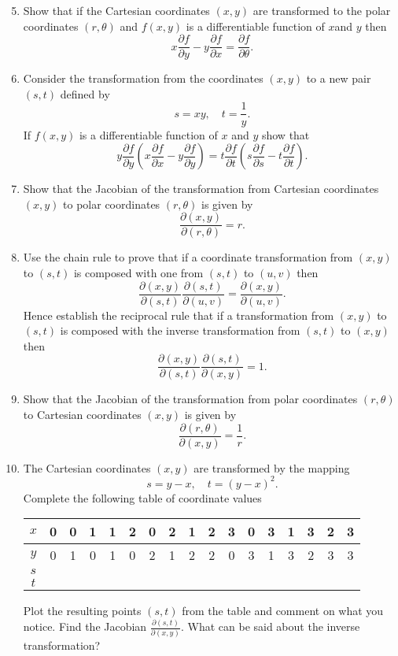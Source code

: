 \documentclass[20pt, a4paper]{extarticle}
\begin{document}
\begin{enumerate}
    \setcounter{enumi}{4}
\item




Show that if the Cartesian  coordinates $(x,y)$ are transformed to the polar coordinates $(r,\theta)$ and $f(x,y)$ is a differentiable function of $x$and $y$ then 
$$x \frac{\partial f}{\partial y} - y \frac{\partial f}{\partial x} = \frac{\partial f}{\partial \theta}.$$
\item
Consider the transformation from the coordinates $(x,y)$ to a new pair $(s,t)$ defined by 
$$s=xy, \quad t=\frac{1}{y} .$$
If $f(x,y)$ is a differentiable function of $x$ and $y$ show that 
$$y \frac{\partial f}{\partial y} \left ( x \frac{\partial f}{\partial x} - y \frac{\partial f}{\partial y} \right ) = t \frac{\partial f}{\partial t} \left ( s \frac{\partial f}{\partial s} - t \frac{\partial f}{\partial t} \right ) .$$
\item
Show that the Jacobian of the transformation from Cartesian coordinates $(x,y)$ to polar coordinates $(r,\theta)$ is given by 
$$\frac{\partial (x,y)}{\partial (r, \theta)} = r.$$
\item
Use the chain rule to prove that if a coordinate transformation from $(x,y)$ to $(s,t)$ is composed with one from $(s,t)$ to $(u,v)$ then 
$$\frac{\partial (x,y)}{\partial (s, t)} \frac{\partial (s,t)}{\partial (u, v)} = \frac{\partial (x,y)}{\partial (u,v)}.$$
Hence establish the reciprocal rule that if a transformation from $(x,y)$ to $(s,t)$ is composed with the inverse transformation from $(s,t)$ to $(x,y)$ then 
$$\frac{\partial (x,y)}{\partial (s, t)} \frac{\partial (s,t)}{\partial (x, y)} = 1.$$
\item
Show that the Jacobian of the transformation from polar coordinates $(r,\theta)$ to Cartesian coordinates $(x,y)$ is given by 
$$\frac{\partial (r,\theta)}{\partial (x, y)} = \frac{1}{r}.$$
\item
The Cartesian coordinates $(x,y)$ are transformed by the mapping 
$$ s = y-x, \quad t=(y-x)^2.$$
Complete the following table of coordinate values

\bigskip

\begin{tabular}{|c|c|c|c|c|c|c|c|c|c|c|c|c|c|c|c|c|}
\hline  $x$& 0 & 0 & 1 & 1 & 2 & 0 & 2 & 1 & 2 & 3 & 0 & 3 & 1 & 3 & 2 & 3 \\ 
\hline  $y$& 0 & 1 & 0 & 1 & 0 & 2 & 1 & 2 & 2 & 0 & 3 & 1 & 3 & 2 & 3 & 3 \\ 
\hline  $s$&  &  &  &  &  &  &  &  &  &  &  &  &  &  &  &  \\ 
\hline  $t$&  &  &  &  &  &  &  &  &  &  &  &  &  &  &  &  \\ 
\hline 
\end{tabular} 

\bigskip

Plot the resulting points $(s,t)$ from the table and comment on what you notice. Find the Jacobian $\frac{\partial (s,t)}{\partial (x, y)}.$ What can be said about the inverse transformation?
\end{enumerate}
\end{document}
